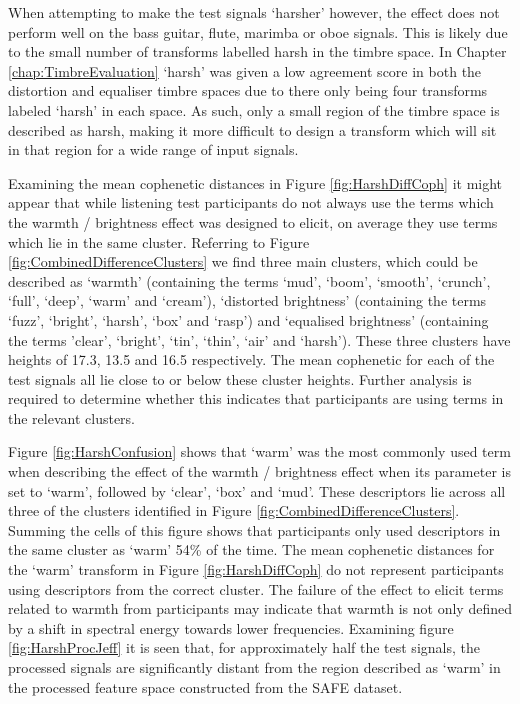 			When attempting to make the test signals `harsher' however, the effect does not perform well on the
			bass guitar, flute, marimba or oboe signals. This is likely due to the small number of transforms
			labelled harsh in the timbre space. In Chapter \ref{chap:TimbreEvaluation} `harsh' was given a low
			agreement score in both the distortion and equaliser timbre spaces due to there only being four
			transforms labeled `harsh' in each space. As such, only a small region of the timbre space is
			described as harsh, making it more difficult to design a transform which will sit in that region
			for a wide range of input signals.
			
			Examining the mean cophenetic distances in Figure \ref{fig:HarshDiffCoph} it might appear that
			while listening test participants do not always use the terms which the warmth / brightness effect
			was designed to elicit, on average they use terms which lie in the same cluster. Referring to
			Figure \ref{fig:CombinedDifferenceClusters} we find three main clusters, which could be described
			as `warmth' (containing the terms `mud', `boom', `smooth', `crunch', `full', `deep', `warm' and
			`cream'), `distorted brightness' (containing the terms `fuzz', `bright', `harsh', `box' and `rasp')
			and `equalised brightness' (containing the terms 'clear', `bright', `tin', `thin', `air' and
			`harsh'). These three clusters have heights of 17.3, 13.5 and 16.5 respectively. The mean
			cophenetic for each of the test signals all lie close to or below these cluster heights. Further
			analysis is required to determine whether this indicates that participants are using terms in the
			relevant clusters.

			Figure \ref{fig:HarshConfusion} shows that `warm' was the most commonly used term when describing
			the effect of the warmth / brightness effect when its parameter is set to `warm', followed by
			`clear', `box' and `mud'. These descriptors lie across all three of the clusters identified in
			Figure \ref{fig:CombinedDifferenceClusters}. Summing the cells of this figure shows that
			participants only used descriptors in the same cluster as `warm' 54\% of the time. The mean
			cophenetic distances for the `warm' transform in Figure \ref{fig:HarshDiffCoph} do not represent
			participants using descriptors from the correct cluster. The failure of the effect to elicit terms
			related to warmth from participants may indicate that warmth is not only defined by a shift in
			spectral energy towards lower frequencies. Examining figure \ref{fig:HarshProcJeff} it is seen
			that, for approximately half the test signals, the processed signals are significantly distant from
			the region described as `warm' in the processed feature space constructed from the SAFE dataset.
			
